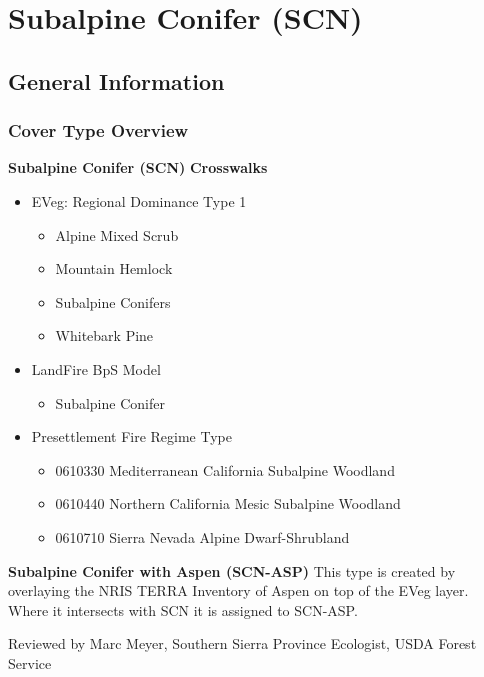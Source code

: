 \newpage
\section{Subalpine Conifer (SCN)}
\label{scn-description}

\subsection*{General Information}

\subsubsection{Cover Type Overview}

\textbf{Subalpine Conifer (SCN)}
\newline
\textbf{Crosswalks}
\begin{itemize}
	\item EVeg: Regional Dominance Type 1
	\begin{itemize}
		\item Alpine Mixed Scrub
		\item Mountain Hemlock
		\item Subalpine Conifers
		\item Whitebark Pine
	\end{itemize}

	\item LandFire BpS Model
	\begin{itemize}
		\item Subalpine Conifer
	\end{itemize}

	\item Presettlement Fire Regime Type
	\begin{itemize}
		\item 0610330 Mediterranean California Subalpine Woodland
		\item 0610440 Northern California Mesic Subalpine Woodland
		\item 0610710 Sierra Nevada Alpine Dwarf-Shrubland
	\end{itemize}
\end{itemize}

\noindent \textbf{Subalpine Conifer with Aspen (SCN-ASP)}
This type is created by overlaying the NRIS TERRA Inventory of Aspen on top of the EVeg layer. Where it intersects with SCN it is assigned to SCN-ASP.
\newline

\noindent Reviewed by Marc Meyer, Southern Sierra Province Ecologist, USDA Forest Service

